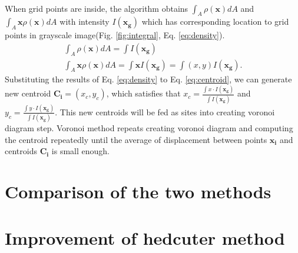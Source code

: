 \documentclass[11pt]{article}
\begin{document}
\\When grid points are inside, the algorithm obtains $\int_{A}\rho(\mathbf{x})dA$ and $\int_{A}\mathbf{x}\rho(\mathbf{x})dA$ with intensity $I(\mathbf{x_g})$ which has corresponding location to grid points in grayscale image(Fig. \ref{fig:integral}, Eq. \ref{eq:density}).
\begin{equation}\label{eq:density} %
\begin{gathered}
\int_{A}\rho(\mathbf{x})dA=\int I(\mathbf{x_g})\\
\int_{A}\mathbf{x}\rho(\mathbf{x})dA=\int \mathbf{x}I(\mathbf{x_g})=\int (x, y)I(\mathbf{x_g}).
\end{gathered}
\end{equation}
Substituting the results of Eq. \ref{eq:density} to Eq. \ref{eq:centroid}, we can generate new centroid $\mathbf{C_i}=(x_c, y_c)$,
which satisfies that $x_c=\frac{\int x\cdot I(\mathbf{x_g})}{\int I(\mathbf{x_g})}$ and $y_c=\frac{\int y\cdot I(\mathbf{x_g})}{\int I(\mathbf{x_g})}$.%
This new centroids will be fed as sites into creating voronoi diagram step. Voronoi method repeats creating voronoi diagram and computing the centroid repeatedly until the average of displacement between points $\mathbf{x_i}$ and centroids $\mathbf{C_i}$ is small enough.
\section{Comparison of the two methods}

\section{Improvement of hedcuter method}



\end{document}
